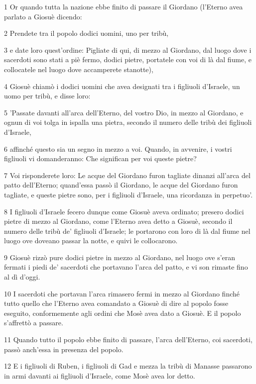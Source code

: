 \par 1 Or quando tutta la nazione ebbe finito di passare il Giordano (l'Eterno avea parlato a Giosuè dicendo:
\par 2 Prendete tra il popolo dodici uomini, uno per tribù,
\par 3 e date loro quest'ordine: Pigliate di qui, di mezzo al Giordano, dal luogo dove i sacerdoti sono stati a piè fermo, dodici pietre, portatele con voi di là dal fiume, e collocatele nel luogo dove accamperete stanotte),
\par 4 Giosuè chiamò i dodici uomini che avea designati tra i figliuoli d'Israele, un uomo per tribù, e disse loro:
\par 5 'Passate davanti all'arca dell'Eterno, del vostro Dio, in mezzo al Giordano, e ognun di voi tolga in ispalla una pietra, secondo il numero delle tribù dei figliuoli d'Israele,
\par 6 affinché questo sia un segno in mezzo a voi. Quando, in avvenire, i vostri figliuoli vi domanderanno: Che significan per voi queste pietre?
\par 7 Voi risponderete loro: Le acque del Giordano furon tagliate dinanzi all'arca del patto dell'Eterno; quand'essa passò il Giordano, le acque del Giordano furon tagliate, e queste pietre sono, per i figliuoli d'Israele, una ricordanza in perpetuo'.
\par 8 I figliuoli d'Israele fecero dunque come Giosuè aveva ordinato; presero dodici pietre di mezzo al Giordano, come l'Eterno avea detto a Giosuè, secondo il numero delle tribù de' figliuoli d'Israele; le portarono con loro di là dal fiume nel luogo ove doveano passar la notte, e quivi le collocarono.
\par 9 Giosuè rizzò pure dodici pietre in mezzo al Giordano, nel luogo ove s'eran fermati i piedi de' sacerdoti che portavano l'arca del patto, e vi son rimaste fino al dì d'oggi.
\par 10 I sacerdoti che portavan l'arca rimasero fermi in mezzo al Giordano finché tutto quello che l'Eterno avea comandato a Giosuè di dire al popolo fosse eseguito, conformemente agli ordini che Mosè avea dato a Giosuè. E il popolo s'affrettò a passare.
\par 11 Quando tutto il popolo ebbe finito di passare, l'arca dell'Eterno, coi sacerdoti, passò anch'essa in presenza del popolo.
\par 12 E i figliuoli di Ruben, i figliuoli di Gad e mezza la tribù di Manasse passarono in armi davanti ai figliuoli d'Israele, come Mosè avea lor detto.
